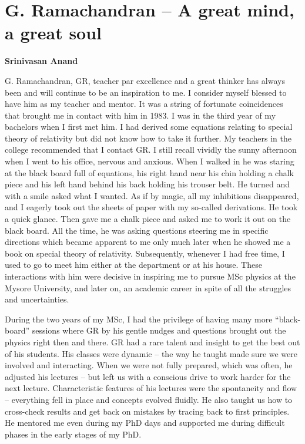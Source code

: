\chapter{G. Ramachandran – A great mind, a great soul}


\begin{center}
\textbf{Srinivasan Anand}
\end{center}

\medskip
G. Ramachandran, GR, teacher par excellence and a great thinker has always been and will continue to be an inspiration to me. I consider myself blessed to have him as my teacher and mentor. It was a string of fortunate coincidences that brought me in contact with him in 1983. I was in the third year of my bachelors when I first met him. I had derived some equations relating to special theory of relativity but did not know how to take it further. My teachers in the college recommended that I contact GR.  I still recall vividly the sunny afternoon when I went to his office, nervous and anxious.  When I walked in he was staring at the black board full of equations, his right hand near his chin holding a chalk piece and his left hand behind his back holding his trouser belt. He turned and with a smile asked what I wanted. As if by magic, all my inhibitions disappeared, and I eagerly took out the sheets of paper with my so-called derivations. He took a quick glance. Then gave me a chalk piece and asked me to work it out on the black board.  All the time, he was asking questions steering me in specific directions which became apparent to me only much later when he showed me a book on special theory of relativity. Subsequently, whenever I had free time, I used to go to meet him either at the department or at his house. These interactions with him were decisive in inspiring me to pursue MSc physics at the Mysore University, and later on, an academic career in spite of all the struggles and uncertainties. 

\newpage

During the two years of my MSc, I had the privilege of having many more “black-board” sessions where GR by his gentle nudges and questions brought out the physics right then and there. GR had a rare talent and insight to get the best out of his students.  His classes were dynamic – the way he taught made sure we were involved and interacting. When we were not fully prepared, which was often, he adjusted his lectures – but left us with a conscious drive to work harder for the next lecture. Characteristic features of his lectures were the spontaneity and flow – everything fell in place and concepts evolved fluidly. He also taught us how to cross-check results and get back on mistakes by tracing back to first principles. He mentored me even during my PhD days and supported me during difficult phases in the early stages of my PhD.

